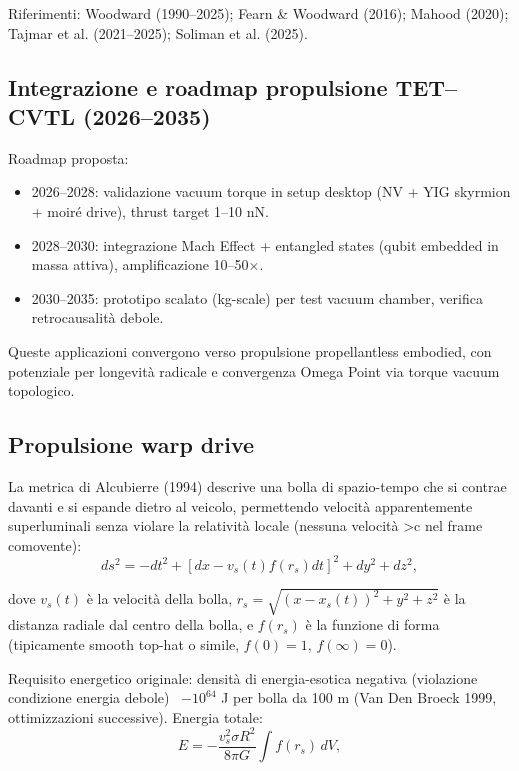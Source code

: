 \documentclass[11pt,a4paper]{article}
\theoremstyle{plain}
\theoremstyle{definition}
\begin{document}
Riferimenti: Woodward (1990--2025); Fearn \& Woodward (2016); Mahood (2020); Tajmar et al. (2021--2025); Soliman et al. (2025).

\subsection{Integrazione e roadmap propulsione TET–CVTL (2026–2035)}

Roadmap proposta:
\begin{itemize}
    \item 2026–2028: validazione vacuum torque in setup desktop (NV + YIG skyrmion + moiré drive), thrust target 1–10 nN.
    \item 2028–2030: integrazione Mach Effect + entangled states (qubit embedded in massa attiva), amplificazione 10–50×.
    \item 2030–2035: prototipo scalato (kg-scale) per test vacuum chamber, verifica retrocausalità debole.
\end{itemize}

Queste applicazioni convergono verso propulsione propellantless embodied, con potenziale per longevità radicale e convergenza Omega Point via torque vacuum topologico.

\vspace{0.4cm}

\subsection{Propulsione warp drive}

La metrica di Alcubierre (1994) descrive una bolla di spazio-tempo che si contrae davanti e si espande dietro al veicolo, permettendo velocità apparentemente superluminali senza violare la relatività locale (nessuna velocità >c nel frame comovente):
\begin{equation}
    ds^2 = -dt^2 + [dx - v_s(t) f(r_s) dt]^2 + dy^2 + dz^2,
    \label{eq:alcubierre_metric}
\end{equation}



\vspace{0.2cm}
dove $v_s(t)$ è la velocità della bolla, $r_s = \sqrt{(x - x_s(t))^2 + y^2 + z^2}$ è la distanza radiale dal centro della bolla, e $f(r_s)$ è la funzione di forma (tipicamente smooth top-hat o simile, $f(0)=1$, $f(\infty)=0$).

\vspace{0.3cm}

Requisito energetico originale: densità di energia-esotica negativa (violazione condizione energia debole) ~$-10^{64}$ J per bolla da 100 m (Van Den Broeck 1999, ottimizzazioni successive). Energia totale:
\begin{equation}
    E = -\frac{v_s^2 \sigma R^2}{8\pi G} \int f(r_s) \, dV,
    \label{eq:alcubierre_energy}
\end{equation}
\end{document}
